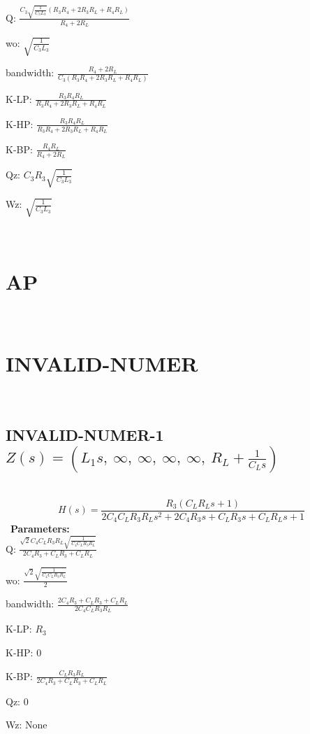 \documentclass{article}
\begin{document}
Q: $\frac{C_{3} \sqrt{\frac{1}{C_{3} L_{3}}} \left(R_{3} R_{4} + 2 R_{3} R_{L} + R_{4} R_{L}\right)}{R_{4} + 2 R_{L}}$\ 

wo: $\sqrt{\frac{1}{C_{3} L_{3}}}$\ 

bandwidth: $\frac{R_{4} + 2 R_{L}}{C_{3} \left(R_{3} R_{4} + 2 R_{3} R_{L} + R_{4} R_{L}\right)}$\ 

K-LP: $\frac{R_{3} R_{4} R_{L}}{R_{3} R_{4} + 2 R_{3} R_{L} + R_{4} R_{L}}$\ 

K-HP: $\frac{R_{3} R_{4} R_{L}}{R_{3} R_{4} + 2 R_{3} R_{L} + R_{4} R_{L}}$\ 

K-BP: $\frac{R_{4} R_{L}}{R_{4} + 2 R_{L}}$\ 

Qz: $C_{3} R_{3} \sqrt{\frac{1}{C_{3} L_{3}}}$\ 

Wz: $\sqrt{\frac{1}{C_{3} L_{3}}}$\ 

\ 

\section{AP}\ 
\section{INVALID-NUMER}\ 
\subsection{INVALID-NUMER-1 $Z(s) = \left( L_{1} s, \  \infty, \  \infty, \  \infty, \  \infty, \  R_{L} + \frac{1}{C_{L} s}\right)$ } \ 
\textbf{\[H(s) = \frac{R_{3} \left(C_{L} R_{L} s + 1\right)}{2 C_{4} C_{L} R_{3} R_{L} s^{2} + 2 C_{4} R_{3} s + C_{L} R_{3} s + C_{L} R_{L} s + 1}\] } \ 
\textbf{Parameters:}\\ 

Q: $\frac{\sqrt{2} C_{4} C_{L} R_{3} R_{L} \sqrt{\frac{1}{C_{4} C_{L} R_{3} R_{L}}}}{2 C_{4} R_{3} + C_{L} R_{3} + C_{L} R_{L}}$\ 

wo: $\frac{\sqrt{2} \sqrt{\frac{1}{C_{4} C_{L} R_{3} R_{L}}}}{2}$\ 

bandwidth: $\frac{2 C_{4} R_{3} + C_{L} R_{3} + C_{L} R_{L}}{2 C_{4} C_{L} R_{3} R_{L}}$\ 

K-LP: $R_{3}$\ 

K-HP: $0$\ 

K-BP: $\frac{C_{L} R_{3} R_{L}}{2 C_{4} R_{3} + C_{L} R_{3} + C_{L} R_{L}}$\ 

Qz: $0$\ 

Wz: $\text{None}$\ 

\ 
\end{document}
